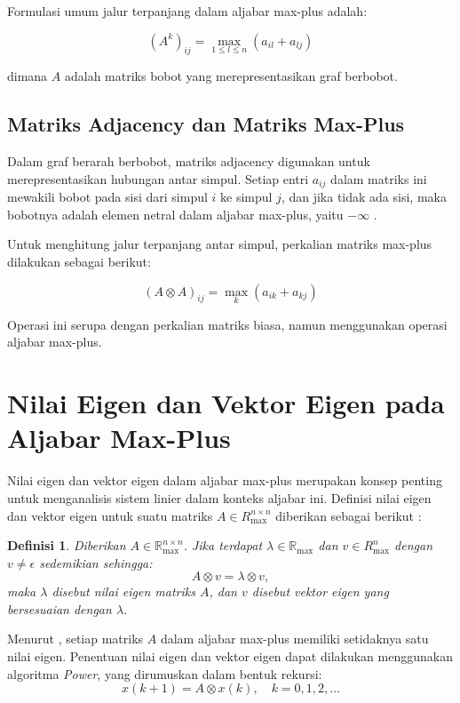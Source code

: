 \documentclass{file/TA-ITS}
\newtheorem{definisi}{Definisi}[section]
\theoremstyle{definition}
\theoremstyle{definition}
\theoremstyle{plain}
\newcommand{\Real}{\mathbb{R}}
\begin{document}
Formulasi umum jalur terpanjang dalam aljabar max-plus adalah:

\[
(A^k)_{ij} = \max_{1 \leq l \leq n} (a_{il} + a_{lj})
\]

dimana \( A \) adalah matriks bobot yang merepresentasikan graf berbobot.

\subsection{Matriks Adjacency dan Matriks Max-Plus}

Dalam graf berarah berbobot, matriks adjacency digunakan untuk merepresentasikan hubungan antar simpul. Setiap entri \( a_{ij} \) dalam matriks ini mewakili bobot pada sisi dari simpul \( i \) ke simpul \( j \), dan jika tidak ada sisi, maka bobotnya adalah elemen netral dalam aljabar max-plus, yaitu \( -\infty \) \cite{baccelli}.

Untuk menghitung jalur terpanjang antar simpul, perkalian matriks max-plus dilakukan sebagai berikut:

\[
(A \otimes A)_{ij} = \max_{k} (a_{ik} + a_{kj})
\]

Operasi ini serupa dengan perkalian matriks biasa, namun menggunakan operasi aljabar max-plus.

\section{Nilai Eigen dan Vektor Eigen pada Aljabar Max-Plus}

Nilai eigen dan vektor eigen dalam aljabar max-plus merupakan konsep penting untuk menganalisis sistem linier dalam konteks aljabar ini. Definisi nilai eigen dan vektor eigen untuk suatu matriks \( A \in R_{\max}^{n \times n} \) diberikan sebagai berikut \cite{andro2020}:

\begin{definisi}
Diberikan \( A \in \Real_{\max}^{n \times n} \). Jika terdapat \( \lambda \in \Real_{\max} \) dan \( v \in R_{\max}^n \) dengan \( v \neq \epsilon \) sedemikian sehingga:
\[
A \otimes v = \lambda \otimes v,
\]
maka \( \lambda \) disebut nilai eigen matriks \( A \), dan \( v \) disebut vektor eigen yang bersesuaian dengan \( \lambda \).
\end{definisi}

Menurut \cite{andro2020}, setiap matriks \( A \) dalam aljabar max-plus memiliki setidaknya satu nilai eigen. Penentuan nilai eigen dan vektor eigen dapat dilakukan menggunakan algoritma \textit{Power}, yang dirumuskan dalam bentuk rekursi:
\[
x(k+1) = A \otimes x(k), \quad k = 0, 1, 2, \dots
\]
\end{document}
